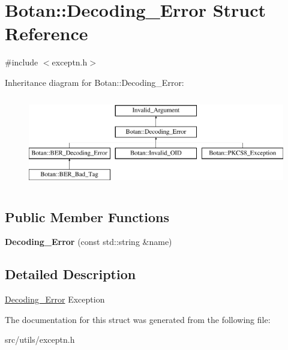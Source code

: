 \hypertarget{structBotan_1_1Decoding__Error}{\section{Botan\-:\-:Decoding\-\_\-\-Error Struct Reference}
\label{structBotan_1_1Decoding__Error}
}


{\ttfamily \#include $<$exceptn.\-h$>$}

Inheritance diagram for Botan\-:\-:Decoding\-\_\-\-Error\-:\begin{figure}[H]
\begin{center}
\leavevmode
\includegraphics[height=4.000000cm]{structBotan_1_1Decoding__Error}
\end{center}
\end{figure}
\subsection*{Public Member Functions}
\begin{DoxyCompactItemize}
\item 
\hypertarget{structBotan_1_1Decoding__Error_ab7a1fb302e6ece55bc34d66edd548d50}{{\bfseries Decoding\-\_\-\-Error} (const std\-::string \&name)}\label{structBotan_1_1Decoding__Error_ab7a1fb302e6ece55bc34d66edd548d50}

\end{DoxyCompactItemize}


\subsection{Detailed Description}
\hyperlink{structBotan_1_1Decoding__Error}{Decoding\-\_\-\-Error} Exception 

The documentation for this struct was generated from the following file\-:\begin{DoxyCompactItemize}
\item 
src/utils/exceptn.\-h\end{DoxyCompactItemize}
